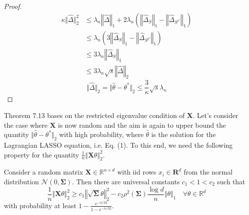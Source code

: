 \documentclass[a4paper, 11pt]{article}
\begin{document}
\begin{proof}
\begin{equation}
\begin{split}
\kappa\Vert\hat{\Delta}\Vert_2^2 & \leq \lambda_n\left\Vert\hat{\Delta} \right\Vert_1 + 2\lambda_n\left( \left\Vert\hat{\Delta}_S \right\Vert_1 - \left\Vert\hat{\Delta}_{S^C} \right\Vert_1 \right) \\
 & \leq \lambda_n\left(3\left\Vert\hat{\Delta}_{S} \right\Vert_1 - \left\Vert\hat{\Delta}_{S^C} \right\Vert_1 \right) \\
 & \leq 3\lambda_n\left\Vert\hat{\Delta}_{S} \right\Vert_1\\
 & \leq 3\lambda_n\sqrt{s}\left\Vert\hat{\Delta} \right\Vert_2
\end{split}
\end{equation}
\begin{equation}
\Vert\hat{\Delta} \Vert_2 = \Vert\hat{\theta}-\theta^* \Vert_2 \leq\frac{3}{\kappa}\sqrt{s}\lambda_n
\end{equation}
\end{proof}



Theorem 7.13 bases on the restricted eigenvalue condition of $\mathbf{X}$. Let's consider the case where $\mathbf{X}$ is now random and the aim is again to upper bound the quantity $\Vert\hat{\theta}-\theta^* \Vert_2$ with high probability, where $\hat{\theta}$ is the solution for the Lagrangian LASSO equation, i.e. Eq. (1). To this end, we need the following property for the quantity $\frac{1}{n}\left\Vert\mathbf{X}\theta \right\Vert_2^2$. \\


\begin{customthm}{7.16}
Consider a random matrix $\mathbf{X}\in\mathbb{R}^{n\times d}$ with iid rows $x_i\in\mathbf{R}^d$ from the normal distribution $\mathcal{N}(0, \mathbf{\Sigma})$. Then there are universal constants $c_1 < 1 < c_2$ such that
\begin{equation}
\frac{1}{n}\left\Vert\mathbf{X}\theta \right\Vert_2^2 \geq c_1\left\Vert\sqrt{\mathbf{\Sigma}}\theta \right\Vert_2^2 - c_2\rho^2(\mathbf{\Sigma})\frac{\log d}{n}\left\Vert\theta \right\Vert_1 \quad \forall \theta\in\mathbb{R}^d
\end{equation}
with probability at least $1-\frac{e^{-n/32}}{1-e^{-n/32}}$.
\end{customthm}
\end{document}
